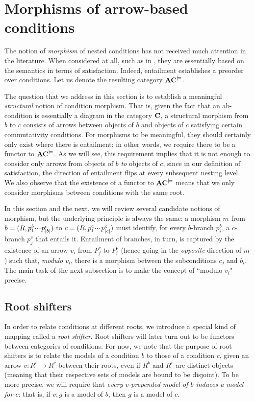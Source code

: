 \section{Morphisms of arrow-based conditions}

The notion of \emph{morphism} of nested conditions has not received much attention in the literature. When considered at all, such as in \cite{bchk:conditional-reactive-systems,sksclo:coinductive-techniques-for-satisfiability}, they are essentially based on the semantics in terms of satisfaction. Indeed, entailment establishes a preorder over conditions. Let us denote the resulting category $\mathbf{AC}^{\models}$.

The question that we address in this section is to establish a meaningful \emph{structural} notion of condition morphism. That is, given the fact that an ab-condition is essentially a diagram in the category $\mathbf{C}$, a structural morphism from $b$ to $c$ consists of arrows between objects of $b$ and objects of $c$ satisfying certain commutativity conditions. For morphisms to be meaningful, they should certainly only exist where there is entailment; in other words, we require there to be a functor to $\mathbf{AC}^{\models}$. As we will see, this requirement implies that it is not enough to consider only arrows from objects of $b$ \emph{to} objects of $c$, since in our definition of satisfaction, the direction of entailment flips at every subsequent nesting level. We also observe that the existence of a functor to $\mathbf{AC}^{\models}$ means that we only consider morphisms between conditions with the same root.

In this section and the next, we will review several candidate notions of morphism, but the underlying principle is always the same: a morphism $m$ from $b=(R,p^b_1{\cdotp\mkern-2mu\cdotp\mkern-2mu\cdotp\mkern1mu} p^c_{|b|})$ to $c=(R,p^c_1{\cdotp\mkern-2mu\cdotp\mkern-2mu\cdotp\mkern1mu} p^c_{|c|})$ must identify, for every $b$-branch $p^b_i$, a $c$-branch $p^c_j$ that entails it. Entailment of branches, in turn, is captured by the existence of an arrow $v_i$ from $P^c_j$ to $P^b_i$ (hence going in the \emph{opposite} direction of $m$) such that, \emph{modulo $v_i$}, there is a morphism between the subconditions $c_j$ and $b_i$. The main task of the next subsection is to make the concept of ``modulo $v_i$" precise.

\subsection{Root shifters}

In order to relate conditions at different roots, we introduce a special kind of mapping called a \emph{root shifter}. Root shifters will later turn out to be functors between categories of conditions. For now, we note that the purpose of root shifters is to relate the models of a condition $b$ to those of a condition $c$, given an arrow $v:R^b\to R^c$ between their roots, even if $R^b$ and $R^c$ are distinct objects (meaning that their respective sets of models are bound to be disjoint). To be more precise, we will require that \emph{every $v$-prepended model of $b$ induces a model for $c$}: that is, if $v;g$ is a model of $b$, then $g$ is a model of $c$.


